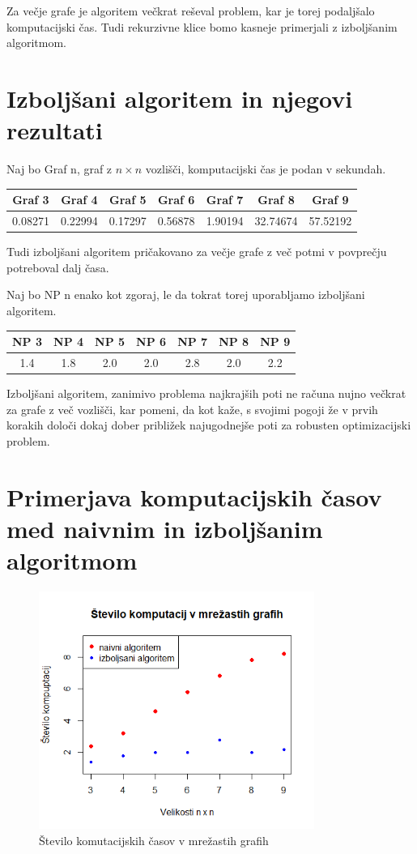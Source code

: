 \documentclass[a4paper, 12 pt]{article}
\theoremstyle{definition} %
\theoremstyle{plain} %
\theoremstyle{definition}
\begin{document}
Za večje grafe je algoritem večkrat reševal problem, kar je torej podaljšalo komputacijski čas. Tudi rekurzivne klice bomo kasneje primerjali z izboljšanim algoritmom.


\section{Izboljšani algoritem in njegovi rezultati}

Naj bo Graf n, graf z $n \times n$ vozlišči, komputacijski čas je podan v sekundah.
\begin{center}
 \begin{tabular}{||c c c c c c c||} 
 \hline
Graf 3 & Graf 4 & Graf 5 & Graf 6 & Graf 7 & Graf 8 & Graf 9 \\ 
 \hline
\hline
0.08271 & 0.22994 & 0.17297 & 0.56878 & 1.90194 & 32.74674 &  57.52192\\ 
 \hline
\end{tabular}
\end{center}

Tudi izboljšani algoritem pričakovano za večje grafe z več potmi v povprečju potreboval dalj časa.



\bigskip
Naj bo NP n enako kot zgoraj, le da tokrat torej uporabljamo izboljšani algoritem.
\begin{center}
 \begin{tabular}{||c c c c c c c||} 
 \hline
 NP 3 &  NP 4 &  NP 5 &  NP 6 &  NP 7 &  NP 8 &  NP 9 \\ 
 \hline
\hline
1.4& 1.8& 2.0& 2.0& 2.8& 2.0& 2.2\\ 
 \hline
\end{tabular}
\end{center}

Izboljšani algoritem, zanimivo problema najkrajših poti ne računa nujno večkrat za grafe z več vozlišči, kar pomeni, da kot kaže, s svojimi pogoji že v prvih korakih določi dokaj dober približek najugodnejše poti za robusten optimizacijski problem.  

\section{Primerjava komputacijskih časov med naivnim in izboljšanim algoritmom}
\begin{figure}[H]
  \centering
  \includegraphics[width=90mm]{rplot.png}
  \caption{Število komutacijskih časov v mrežastih grafih}
  \label{fig: Graf 1}
\end{figure}
\end{document}
